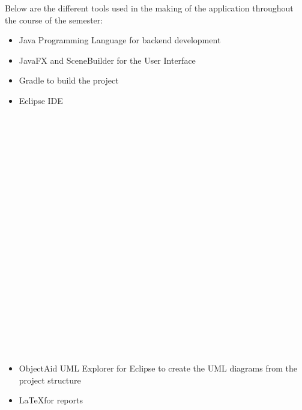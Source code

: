 \documentclass[hidelinks,conference,12pt]{IEEETran}
\begin{document}
Below are the different tools used in the making of the application throughout the course of the semester:
\begin{itemize}
	\item Java Programming Language for backend development
	\item JavaFX and SceneBuilder for the User Interface
	\item Gradle to build the project
	\item Eclipse IDE\\\\\\\\\\\\\\\\\\\\\\\\\\\\\\\\\\\\\\\\\\\
	\item ObjectAid UML Explorer for Eclipse to create the UML diagrams from the project structure
	\item \LaTeX \space for reports
\end{itemize}
\end{document}
